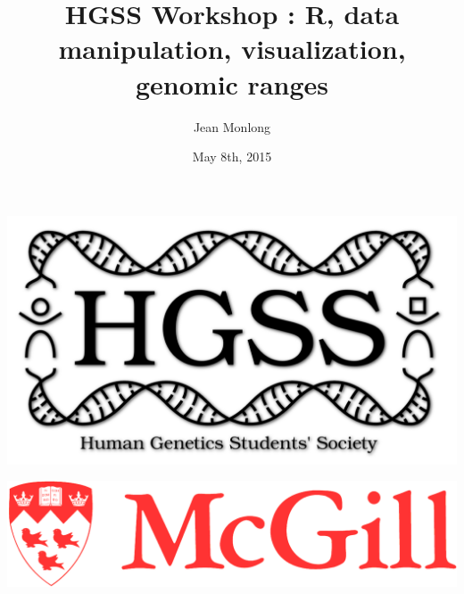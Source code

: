 \documentclass[10pt]{beamer}
\title{HGSS Workshop : R, data manipulation, visualization, genomic ranges}
\author{Jean Monlong}
\institute{Human Genetics department}
\date{May 8th, 2015}
\begin{document}
\begin{frame}
  \centering
  \titlepage
  \begin{minipage}{.4\textwidth}
    \includegraphics[width=.8\linewidth]{../imgs/hgssLogo-black.png}
  \end{minipage}
  \hspace{.1\textwidth}
  \begin{minipage}{.4\textwidth}
    \includegraphics[width=\linewidth]{../imgs/McGill-Logo1.png}
  \end{minipage}

\end{frame}
\end{document}

